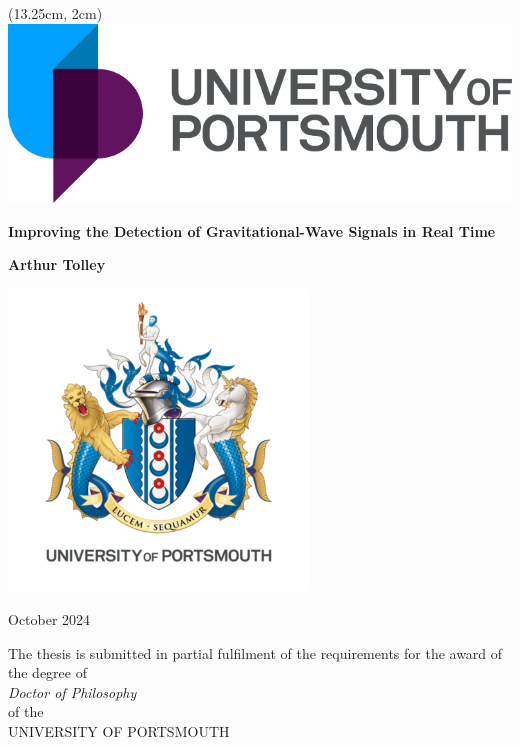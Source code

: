 \begin{titlepage}
    \begin{center}
        \begin{textblock*}{6cm}(13.25cm, 2cm) %
            \includegraphics[width=\textwidth]{images/preamble/UoP_Logo.pdf}
        \end{textblock*}

        \vspace*{1.5cm}

        \begin{tcolorbox}[colback=gray!10, colframe=white, boxrule=0pt, sharp corners, width=\paperwidth, height=5cm, valign=center, enlarge left by=-2in, enlarge right by=-1.6in]
            \centering
            \parbox{0.6\textwidth}{ %
                \centering
                \Huge \textbf{Improving the Detection of Gravitational-Wave Signals in Real Time}
            }
        \end{tcolorbox}

        \vspace{0.5cm}
        \Huge \textbf{Arthur Tolley}

        \vspace{0.5cm}

        \includegraphics[width=0.6\textwidth]{images/preamble/UoP_Crest.pdf}
        
        \small October 2024

        \vspace{1.0cm}

        {The thesis is submitted in partial fulfilment of the requirements for the award of the degree of}\\
        {\textit{Doctor of Philosophy}}\\
        {of the}\\
        {UNIVERSITY OF PORTSMOUTH}

    \end{center}
\end{titlepage}
